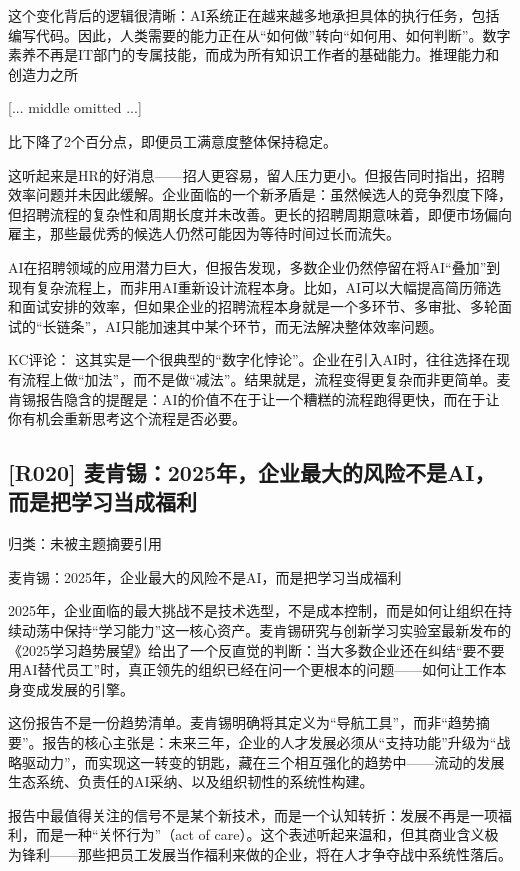 \documentclass[11pt]{ctexart}
\begin{document}
这个变化背后的逻辑很清晰：AI系统正在越来越多地承担具体的执行任务，包括编写代码。因此，人类需要的能力正在从“如何做”转向“如何用、如何判断”。数字素养不再是IT部门的专属技能，而成为所有知识工作者的基础能力。推理能力和创造力之所

[... middle omitted ...]

比下降了2个百分点，即便员工满意度整体保持稳定。

这听起来是HR的好消息——招人更容易，留人压力更小。但报告同时指出，招聘效率问题并未因此缓解。企业面临的一个新矛盾是：虽然候选人的竞争烈度下降，但招聘流程的复杂性和周期长度并未改善。更长的招聘周期意味着，即便市场偏向雇主，那些最优秀的候选人仍然可能因为等待时间过长而流失。

AI在招聘领域的应用潜力巨大，但报告发现，多数企业仍然停留在将AI“叠加”到现有复杂流程上，而非用AI重新设计流程本身。比如，AI可以大幅提高简历筛选和面试安排的效率，但如果企业的招聘流程本身就是一个多环节、多审批、多轮面试的“长链条”，AI只能加速其中某个环节，而无法解决整体效率问题。

KC评论： 这其实是一个很典型的“数字化悖论”。企业在引入AI时，往往选择在现有流程上做“加法”，而不是做“减法”。结果就是，流程变得更复杂而非更简单。麦肯锡报告隐含的提醒是：AI的价值不在于让一个糟糕的流程跑得更快，而在于让你有机会重新思考这个流程是否必要。

\subsection{[R020] 麦肯锡：2025年，企业最大的风险不是AI，而是把学习当成福利}
{\small\color{refgray}归类：未被主题摘要引用}

麦肯锡：2025年，企业最大的风险不是AI，而是把学习当成福利

2025年，企业面临的最大挑战不是技术选型，不是成本控制，而是如何让组织在持续动荡中保持“学习能力”这一核心资产。麦肯锡研究与创新学习实验室最新发布的《2025学习趋势展望》给出了一个反直觉的判断：当大多数企业还在纠结“要不要用AI替代员工”时，真正领先的组织已经在问一个更根本的问题——如何让工作本身变成发展的引擎。

这份报告不是一份趋势清单。麦肯锡明确将其定义为“导航工具”，而非“趋势摘要”。报告的核心主张是：未来三年，企业的人才发展必须从“支持功能”升级为“战略驱动力”，而实现这一转变的钥匙，藏在三个相互强化的趋势中——流动的发展生态系统、负责任的AI采纳、以及组织韧性的系统性构建。

报告中最值得关注的信号不是某个新技术，而是一个认知转折：发展不再是一项福利，而是一种“关怀行为”（act of care）。这个表述听起来温和，但其商业含义极为锋利——那些把员工发展当作福利来做的企业，将在人才争夺战中系统性落后。
\end{document}
